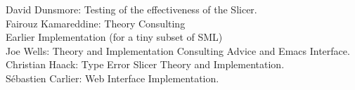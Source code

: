 \documentclass{report}
\begin{document}
	David Dunsmore: Testing of the effectiveness of the Slicer.\\

	Fairouz Kamareddine: Theory Consulting\\

Earlier Implementation (for a tiny subset of SML)\\

	Joe Wells: Theory and Implementation Consulting Advice and Emacs
	    	   Interface.\\

	Christian Haack: Type Error Slicer Theory and Implementation.\\

	Sébastien Carlier: Web Interface Implementation.
\end{document}
